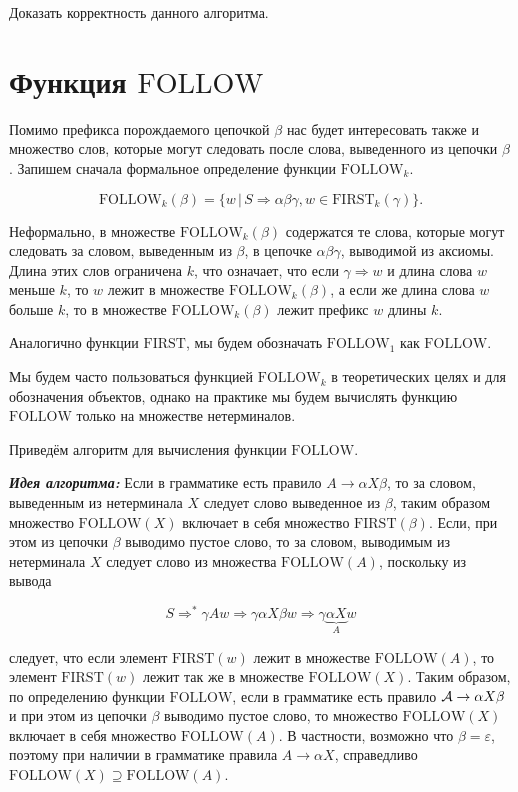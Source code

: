 \documentclass[12pt]{article}
\theoremstyle{definiton}
\theoremstyle{definition}
\theoremstyle{definition}
\theoremstyle{definition}
\let\eps\varepsilon
\let\yield\Rightarrow
\def\yields{\Rightarrow^*}
\def\A{{\cal A}}
\def\first{\mathrm{ FIRST} }
\def\follow{\mathrm{ FOLLOW} }
\newcounter{problem}
\newcounter{uproblem}
\newcounter{subproblem}
\def\upr{\medskip\noindent\stepcounter{uproblem}{\bf Упражнение \theuproblem .  }\setcounter{subproblem}{0} }
\begin{document}
\upr Доказать корректность данного алгоритма.

\section{Функция $\follow$}

Помимо префикса порождаемого цепочкой $\beta$ нас будет интересовать также и множество слов, которые могут следовать после слова, выведенного из цепочки $\beta$. Запишем сначала формальное определение функции $\follow_k$.

$$
	\follow_k(\beta) = \{ w\,|\, S \yield \alpha\beta\gamma, w \in \first_k(\gamma) \}.
$$

Неформально, в множестве $\follow_k(\beta)$ содержатся те слова, которые могут следовать за словом, выведенным из $\beta$, в цепочке $\alpha\beta\gamma$, выводимой из аксиомы. Длина этих слов ограничена $k$, что означает, что если $\gamma \yield w$ и длина слова $w$ меньше $k$, то $w$ лежит в множестве $\follow_k(\beta)$, а если же  длина слова $w$ больше $k$, то в множестве $\follow_k(\beta)$ лежит префикс $w$ длины $k$. 

Аналогично функции $\first$, мы будем обозначать $\follow_1$ как $\follow$.

Мы будем часто пользоваться функцией $\follow_k$ в теоретических целях и для обозначения объектов, однако на практике мы будем вычислять функцию $\follow$ только на множестве нетерминалов.



Приведём алгоритм для вычисления функции $\follow$.

\textbf{\emph{Идея алгоритма:}} Если в грамматике есть правило $A \to \alpha X\beta$, то за словом, выведенным из нетерминала $X$ следует слово выведенное из $\beta$, таким образом множество $\follow(X) $ включает в себя множество $ \first(\beta)$. Если, при этом из цепочки $\beta$ выводимо пустое слово, то за словом, выводимым из нетерминала $X$ следует слово из множества $\follow(A)$, поскольку из вывода

$$ S \yields \gamma A w \yield \gamma \alpha X \beta w \yield  \gamma \underbrace{\alpha X}_{A} w  $$

следует, что если элемент $\first(w) $ лежит в множестве $ \follow(A)$, то элемент $\first(w) $ лежит так же в множестве $ \follow(X)$. Таким образом, по определению функции $\follow$, если в грамматике есть правило $\A \to \alpha X \beta$ и при этом из цепочки $\beta $ выводимо пустое слово, то множество $\follow(X) $ включает в себя множество $ \follow (A)$. В частности, возможно что $\beta = \eps$, поэтому при наличии в грамматике правила $A \to \alpha X$, справедливо $\follow(X) \supseteq \follow (A)$.
\end{document}
